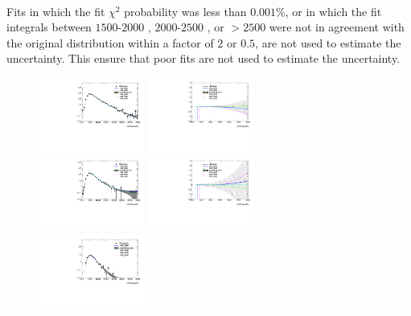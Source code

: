 \paragraph{}
Fits in which the fit $\chi^2$ probability was less than $0.001\%$, or in which the fit integrals between $1500$-$2000$ \GeV, $2000$-$2500$ \GeV, or $>2500$ \GeV were not in agreement with the original distribution within a factor of $2$ or $0.5$, are not used to estimate the uncertainty. This ensure that poor fits are not used to estimate the uncertainty.

\begin{figure}[htbp!]
\begin{center}
\includegraphics[width=0.31\textwidth,angle=-90]{figures/boosted/Syst_Smooth/smoothFuncRangeCompare_22_comp.pdf}
\includegraphics[width=0.31\textwidth,angle=-90]{figures/boosted/Syst_Smooth/smoothFuncRangeCompare_22_comp_ratio.pdf} \\
\includegraphics[width=0.31\textwidth,angle=-90]{figures/boosted/Syst_Smooth/smoothFuncRangeCompare_33_comp.pdf}
\includegraphics[width=0.31\textwidth,angle=-90]{figures/boosted/Syst_Smooth/smoothFuncRangeCompare_33_comp_ratio.pdf} \\
\includegraphics[width=0.31\textwidth,angle=-90]{figures/boosted/Syst_Smooth/smoothFuncRangeCompare_44_comp.pdf}

\end{center}
\end{figure}
